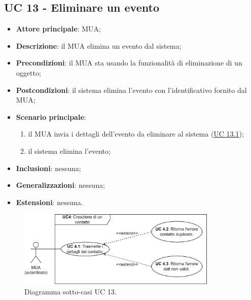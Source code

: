 \subsection{UC 13 - Eliminare un evento} \label{sec:UC13}
    \begin{itemize}
        \item \textbf{Attore principale}: MUA;
        \item \textbf{Descrizione}: il MUA elimina un evento dal sistema;
        \item \textbf{Precondizioni}: il MUA sta usando la funzionalità di eliminazione di un oggetto;
        \item \textbf{Postcondizioni}: il sistema elimina l'evento con l'identificativo fornito dal MUA;
        \item \textbf{Scenario principale}:
            \begin{enumerate}
                \item il MUA invia i dettagli dell'evento da eliminare al sistema (\hyperref[sec:UC13.1]{UC 13.1});
                \item il sistema elimina l'evento;
            \end{enumerate}
        \item \textbf{Inclusioni}: nessuna;
        \item \textbf{Generalizzazioni}: nessuna;
        \item \textbf{Estensioni}: nessuna.
    \end{itemize}

\begin{figure}[h]
    \includegraphics[width=0.85\textwidth]{sections/uc_imgs/UC04.X.png}
    \centering
    \caption{Diagramma sotto-casi UC 13.}
\end{figure}

